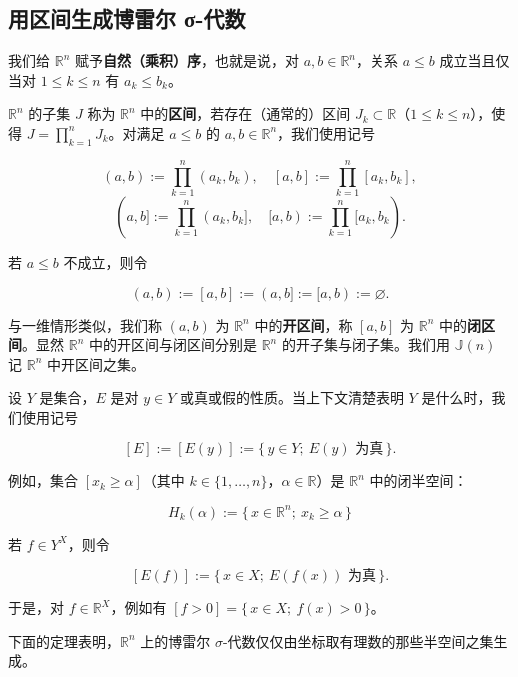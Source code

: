 \subsection*{用区间生成博雷尔 σ-代数}

我们给 $ \mathbb{R}^{n} $ 赋予\textbf{自然（乘积）序}，也就是说，对 $ a, b \in \mathbb{R}^{n} $，关系 $ a \le b $ 成立当且仅当对 $ 1 \le k \le n $ 有 $ a_{k} \le b_{k} $。

$ \mathbb{R}^{n} $ 的子集 $ J $ 称为 $ \mathbb{R}^{n} $ 中的\textbf{区间}，若存在（通常的）区间 $ J_{k} \subset \mathbb{R} $（$ 1 \le k \le n $），使得 $ J = \prod_{k=1}^{n} J_{k} $。对满足 $ a \le b $ 的 $ a, b \in \mathbb{R}^{n} $，我们使用记号

\[
(a, b) := \prod_{k=1}^{n} (a_{k}, b_{k}) , \quad [a, b] := \prod_{k=1}^{n} [a_{k}, b_{k}] ,
\]
\[
(a, b] := \prod_{k=1}^{n} (a_{k}, b_{k}] , \quad [a, b) := \prod_{k=1}^{n} [a_{k}, b_{k}) .
\]

若 $ a \le b $ 不成立，则令

\[
(a, b) := [a, b] := (a, b] := [a, b) := \varnothing .
\]

与一维情形类似，我们称 $ (a, b) $ 为 $ \mathbb{R}^{n} $ 中的\textbf{开区间}，称 $ [a, b] $ 为 $ \mathbb{R}^{n} $ 中的\textbf{闭区间}。显然 $ \mathbb{R}^{n} $ 中的开区间与闭区间分别是 $ \mathbb{R}^{n} $ 的开子集与闭子集。我们用 $ \mathbb{J}(n) $ 记 $ \mathbb{R}^{n} $ 中开区间之集。

设 $ Y $ 是集合，$ E $ 是对 $ y \in Y $ 或真或假的性质。当上下文清楚表明 $ Y $ 是什么时，我们使用记号

\[
[E] := [E(y)] := \{\, y \in Y ;\ E(y) \text{ 为真} \,\} .
\]

例如，集合 $ [x_{k} \ge \alpha] $（其中 $ k \in \{1, \ldots, n\} $，$ \alpha \in \mathbb{R} $）是 $ \mathbb{R}^{n} $ 中的闭半空间：

\[
H_{k}(\alpha) := \{\, x \in \mathbb{R}^{n} ;\ x_{k} \ge \alpha \,\}
\]

若 $ f \in Y^{X} $，则令

\[
[E(f)] := \{\, x \in X ;\ E(f(x)) \text{ 为真} \,\} .
\]

于是，对 $ f \in \mathbb{R}^{X} $，例如有 $ [f > 0] = \{\, x \in X ;\ f(x) > 0 \,\} $。

下面的定理表明，$ \mathbb{R}^{n} $ 上的博雷尔 $ \sigma $-代数仅仅由坐标取有理数的那些半空间之集生成。

